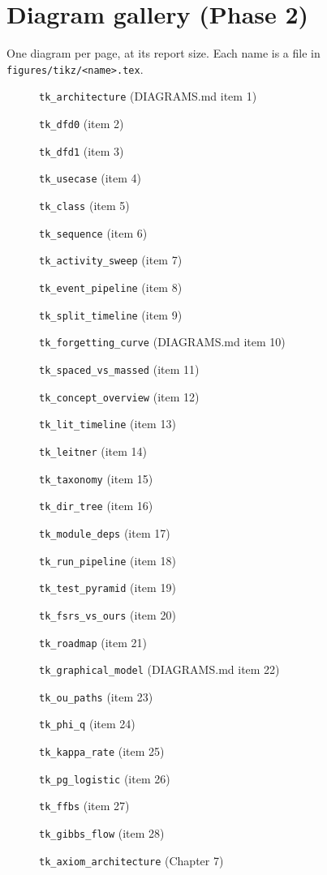 \documentclass[12pt,a4paper]{report}
\begin{document}
\pagestyle{empty}
\chapter*{Diagram gallery (Phase 2)}
One diagram per page, at its report size. Each name is a file in
\texttt{figures/tikz/}\allowbreak\texttt{<name>.tex}.

\newsavebox{\galbox}
\newcommand{\GalleryItem}[2]{%
  \sbox{\galbox}{}%
  \clearpage
  \begin{figure}[p]
    \centering
    
    \caption{#2}
  \end{figure}%
}

\GalleryItem{tk_architecture}{\texttt{tk\_architecture} (DIAGRAMS.md item 1)}
\GalleryItem{tk_dfd0}{\texttt{tk\_dfd0} (item 2)}
\GalleryItem{tk_dfd1}{\texttt{tk\_dfd1} (item 3)}
\GalleryItem{tk_usecase}{\texttt{tk\_usecase} (item 4)}
\GalleryItem{tk_class}{\texttt{tk\_class} (item 5)}
\GalleryItem{tk_sequence}{\texttt{tk\_sequence} (item 6)}
\GalleryItem{tk_activity_sweep}{\texttt{tk\_activity\_sweep} (item 7)}
\GalleryItem{tk_event_pipeline}{\texttt{tk\_event\_pipeline} (item 8)}
\GalleryItem{tk_split_timeline}{\texttt{tk\_split\_timeline} (item 9)}

\GalleryItem{tk_forgetting_curve}{\texttt{tk\_forgetting\_curve} (DIAGRAMS.md item 10)}
\GalleryItem{tk_spaced_vs_massed}{\texttt{tk\_spaced\_vs\_massed} (item 11)}
\GalleryItem{tk_concept_overview}{\texttt{tk\_concept\_overview} (item 12)}
\GalleryItem{tk_lit_timeline}{\texttt{tk\_lit\_timeline} (item 13)}
\GalleryItem{tk_leitner}{\texttt{tk\_leitner} (item 14)}
\GalleryItem{tk_taxonomy}{\texttt{tk\_\allowbreak taxonomy} (item 15)}
\GalleryItem{tk_dir_tree}{\texttt{tk\_\allowbreak dir\_tree} (item 16)}
\GalleryItem{tk_module_deps}{\texttt{tk\_module\_deps} (item 17)}
\GalleryItem{tk_run_pipeline}{\texttt{tk\_run\_pipeline} (item 18)}
\GalleryItem{tk_test_pyramid}{\texttt{tk\_test\_pyramid} (item 19)}
\GalleryItem{tk_fsrs_vs_ours}{\texttt{tk\_fsrs\_vs\_ours} (item 20)}
\GalleryItem{tk_roadmap}{\texttt{tk\_roadmap} (item 21)}

\GalleryItem{tk_graphical_model}{\texttt{tk\_graphical\_model} (DIAGRAMS.md item 22)}
\GalleryItem{tk_ou_paths}{\texttt{tk\_ou\_paths} (item 23)}
\GalleryItem{tk_phi_q}{\texttt{tk\_phi\_q} (item 24)}
\GalleryItem{tk_kappa_rate}{\texttt{tk\_kappa\_rate} (item 25)}
\GalleryItem{tk_pg_logistic}{\texttt{tk\_pg\_logistic} (item 26)}
\GalleryItem{tk_ffbs}{\texttt{tk\_ffbs} (item 27)}
\GalleryItem{tk_gibbs_flow}{\texttt{tk\_gibbs\_flow} (item 28)}

\GalleryItem{tk_axiom_architecture}{\texttt{tk\_axiom\_architecture} (Chapter 7)}
\end{document}

